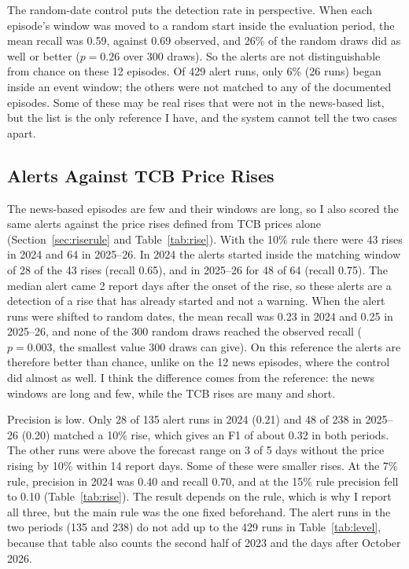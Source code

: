 The random-date control puts the detection rate in perspective. When each episode's window was moved to a random start inside the evaluation period, the mean recall was 0.59, against 0.69 observed, and 26\% of the random draws did as well or better ($p=0.26$ over 300 draws). So the alerts are not distinguishable from chance on these 12 episodes. Of 429 alert runs, only 6\% (26 runs) began inside an event window; the others were not matched to any of the documented episodes. Some of these may be real rises that were not in the news-based list, but the list is the only reference I have, and the system cannot tell the two cases apart.

\begin{table}[H]\centering\small
\caption[The 12 documented episodes and alert detection]{The 12 documented episodes and whether an alert started inside the window (level 0.95). Lead is the number of days between the first alert and the news peak, negative if before.}\label{tab:events}

\par{}
\end{table}

\subsection{Alerts Against TCB Price Rises}
The news-based episodes are few and their windows are long, so I also scored the same alerts against the price rises defined from TCB prices alone (Section~\ref{sec:riserule} and Table~\ref{tab:rise}). With the 10\% rule there were 43 rises in 2024 and 64 in 2025--26. In 2024 the alerts started inside the matching window of 28 of the 43 rises (recall 0.65), and in 2025--26 for 48 of 64 (recall 0.75). The median alert came 2 report days after the onset of the rise, so these alerts are a detection of a rise that has already started and not a warning. When the alert runs were shifted to random dates, the mean recall was 0.23 in 2024 and 0.25 in 2025--26, and none of the 300 random draws reached the observed recall ($p=0.003$, the smallest value 300 draws can give). On this reference the alerts are therefore better than chance, unlike on the 12 news episodes, where the control did almost as well. I think the difference comes from the reference: the news windows are long and few, while the TCB rises are many and short.

Precision is low. Only 28 of 135 alert runs in 2024 (0.21) and 48 of 238 in 2025--26 (0.20) matched a 10\% rise, which gives an F1 of about 0.32 in both periods. The other runs were above the forecast range on 3 of 5 days without the price rising by 10\% within 14 report days. Some of these were smaller rises. At the 7\% rule, precision in 2024 was 0.40 and recall 0.70, and at the 15\% rule precision fell to 0.10 (Table~\ref{tab:rise}). The result depends on the rule, which is why I report all three, but the main rule was the one fixed beforehand. The alert runs in the two periods (135 and 238) do not add up to the 429 runs in Table~\ref{tab:level}, because that table also counts the second half of 2023 and the days after October 2026.

